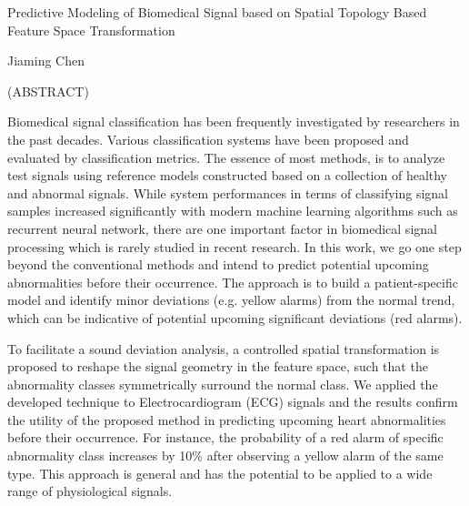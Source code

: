 
\begin{center}

\vfill

{\large Predictive Modeling of Biomedical Signal based on Spatial Topology Based Feature Space Transformation }

Jiaming Chen

{(ABSTRACT)}




\vfill

\end{center}
Biomedical signal classification has been frequently investigated by researchers in the past decades. Various classification systems have been proposed and evaluated by classification metrics. The essence of most methods, is to analyze test signals using reference models constructed based on a collection of healthy and abnormal signals. While system performances in terms of classifying signal samples increased significantly with modern machine learning algorithms such as recurrent neural network, there are one important factor in biomedical signal processing which is rarely studied in recent research.  In this work, we go one step beyond the conventional methods and intend to predict potential upcoming abnormalities before their occurrence. The approach is to build a patient-specific model and identify minor deviations (e.g. yellow alarms) from the normal trend, which can be indicative of potential upcoming significant deviations (red alarms). 

To facilitate a sound deviation analysis, a controlled spatial transformation is proposed to reshape the signal geometry in the feature space, such that the abnormality classes symmetrically surround the normal class. We applied the developed technique to Electrocardiogram (ECG) signals and the results confirm the utility of the proposed method in predicting upcoming heart abnormalities before their occurrence. For instance, the probability of a red alarm of specific abnormality class increases by 10\% after observing a yellow alarm of the same type. This approach is general and has the potential to be applied to a wide range of physiological signals.


